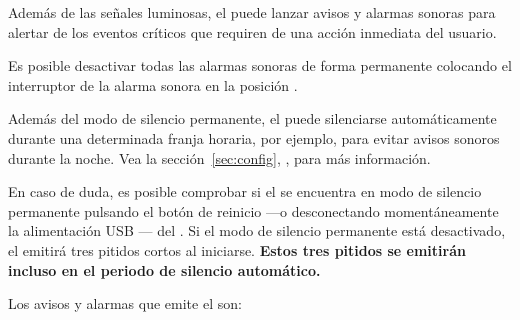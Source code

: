 Además de las señales luminosas, el \CMS puede lanzar avisos y alarmas sonoras para alertar de los eventos críticos que requiren de una acción in\-me\-diata del usuario.

Es posible desactivar todas las alarmas sonoras de forma permanente colocando el interruptor de la alarma sonora  en la posición \off.
\tipend

Además del modo de silencio permanente, el \CMS puede silenciarse automáticamente durante una determinada franja horaria, por ejemplo, para evitar avisos sonoros durante la noche. Vea la sección~\ref{sec:config}, , para más información.
\tipend

En caso de duda, es posible comprobar si el \CMS se encuentra en modo de silencio permanente pulsando el botón de reinicio  ---o desconectando momentáneamente la alimentación USB --- del \MIE. Si el modo de silencio permanente está desactivado, el \CMS emitirá tres pitidos cortos al iniciarse. \textbf{Estos tres pitidos se emitirán incluso en el periodo de silencio automático.}
\tipend


Los avisos y alarmas que emite el \CMS son:

